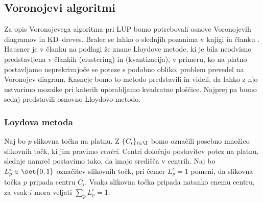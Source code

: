 \subsection{Voronojevi algoritmi}
%
Za opis Voronojevega algoritma pri LUP bomo potrebovali osnove Voronojevih diagramov in KD--dreves. %
Bralec se lahko o slednjih pozanima v knjigi \cite{Orourke} in članku \cite{nevemse}. Hausner je v članku \cite{Hausner} na podlagi že znane Lloydove metode, ki je bila neodvisno predstavljena v člankih \cite{} (clustering) in \cite{} (kvantizacija), v primeru, ko na platno postavljamo neprekrivajoče se poteze s podobno obliko, problem prevedel na Voronojev diagram. Kasneje bomo to metodo predstavili in videli, da lahko z njo ustvarimo mozaike pri katerih uporabljamo kvadratne ploščice. Najprej pa bomo sedaj predstavili osnovno Lloydovo metodo.
%
\subsubsection{Loydova metoda}
%
Naj bo $p$ slikovna točka na platnu. Z $\{C_i\}_{i \in \I}$ bomo označili posebno množico slikovnih točk, ki jim pravimo \emph{centri}. Centri določajo postavitev potez na platnu, slednje namreč postavimo tako, da imajo središča v centrih. Naj bo $L_p^i \in \set{0, 1}$ označitev slikovnih točk, pri čemer $L_p^i = 1$ pomeni, da slikovna točka $p$ pripada centru $C_i$. Vsaka slikovna točka pripada natanko enemu centru, za vsak $i$ mora veljati $\sum_p L_p^i = 1$.

